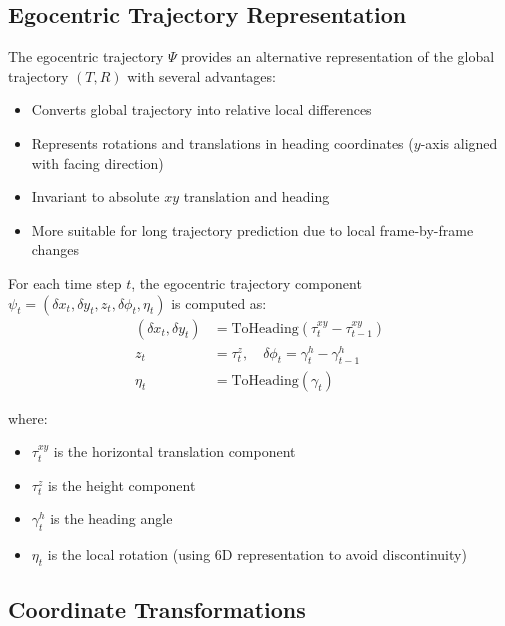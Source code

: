 \subsection*{Egocentric Trajectory Representation}
The egocentric trajectory $\Psi$ provides an alternative representation of the global trajectory $(T, R)$ with several advantages:
\begin{itemize}
    \item Converts global trajectory into relative local differences
    \item Represents rotations and translations in heading coordinates ($y$-axis aligned with facing direction)
    \item Invariant to absolute $xy$ translation and heading
    \item More suitable for long trajectory prediction due to local frame-by-frame changes
\end{itemize}

For each time step $t$, the egocentric trajectory component $\psi_t = (\delta x_t, \delta y_t, z_t, \delta\phi_t, \eta_t)$ is computed as:
\begin{align}
    (\delta x_t, \delta y_t) &= \text{ToHeading}(\tau^{xy}_t - \tau^{xy}_{t-1}) \tag{3} \\
    z_t &= \tau^z_t, \quad \delta\phi_t = \gamma^h_t - \gamma^h_{t-1} \tag{4} \\
    \eta_t &= \text{ToHeading}(\gamma_t) \tag{5}
\end{align}

where:
\begin{itemize}
    \item $\tau^{xy}_t$ is the horizontal translation component
    \item $\tau^z_t$ is the height component
    \item $\gamma^h_t$ is the heading angle
    \item $\eta_t$ is the local rotation (using 6D representation to avoid discontinuity)
\end{itemize}

\subsection*{Coordinate Transformations}

